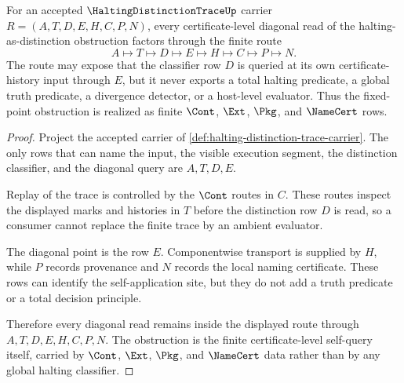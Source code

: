 \begin{theorem}
\label{thm:halting-distinction-diagonal-obstruction-package}
For an accepted $\HaltingDistinctionTraceUp$ carrier $R=(A,T,D,E,H,C,P,N)$, every certificate-level diagonal read of the halting-as-distinction obstruction factors through the finite route
$$
A \longmapsto T \longmapsto D \longmapsto E \longmapsto H \longmapsto C \longmapsto P \longmapsto N.
$$
The route may expose that the classifier row $D$ is queried at its own certificate-history input through $E$, but it never exports a total halting predicate, a global truth predicate, a divergence detector, or a host-level evaluator. Thus the fixed-point obstruction is realized as finite $\Cont$, $\Ext$, $\Pkg$, and $\NameCert$ rows.
\end{theorem}
\begin{proof}
Project the accepted carrier of \autoref{def:halting-distinction-trace-carrier}. The only rows that can name the input, the visible execution segment, the distinction classifier, and the diagonal query are $A,T,D,E$.

Replay of the trace is controlled by the $\Cont$ routes in $C$. These routes inspect the displayed marks and histories in $T$ before the distinction row $D$ is read, so a consumer cannot replace the finite trace by an ambient evaluator.

The diagonal point is the row $E$. Componentwise transport is supplied by $H$, while $P$ records provenance and $N$ records the local naming certificate. These rows can identify the self-application site, but they do not add a truth predicate or a total decision principle.

Therefore every diagonal read remains inside the displayed route through $A,T,D,E,H,C,P,N$. The obstruction is the finite certificate-level self-query itself, carried by $\Cont$, $\Ext$, $\Pkg$, and $\NameCert$ data rather than by any global halting classifier.
\end{proof}

